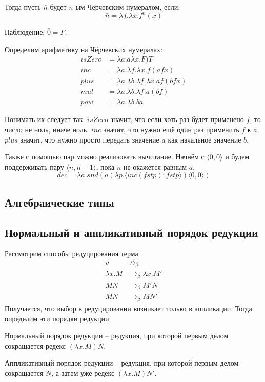 Тогда пусть $\bar{n}$ будет $n$-ым Чёрчевским нумералом, если:
\begin{equation}
\bar{n} = \lambda f . \lambda x . f^n(x)
\end{equation}

Наблюдение: $\bar{0} = F$.

Определим арифметику на Чёрчевских нумералах:
\begin{align*}
isZero &= \lambda a . a \lambda x . F) T \\
inc &= \lambda a . \lambda f . \lambda x . f (a f x) \\
plus &= \lambda a . \lambda  b . \lambda f . \lambda x . a f (b f x) \\
mul &= \lambda a . \lambda b . \lambda f . a (b f) \\
pow &= \lambda a . \lambda b . b a
\end{align*}

Понимать их следует так: $isZero$ значит, что если хоть раз будет применено $f$, 
то число не ноль, иначе ноль. $inc$ значит, что нужно ещё
один раз применить $f$ к $a$. $plus$ значит, что нужно просто передать значение
$a$ как начальное значение $b$.

Также с помощью пар можно реализовать вычитание. Начнём с $\langle 0, 0 \rangle$ и будем
поддерживать пару $\langle n, n - 1 \rangle$, пока $n$ не окажется равным $a$.
\begin{equation}
dec = \lambda a . snd (a (\lambda p . \langle inc (fst p); fst p \rangle ) \langle 0, 0 \rangle )
\end{equation}

\subsection{Алгебраические типы}
\label{sec-3-4}


\subsection{Нормальный и аппликативный порядок редукции}
\label{sec-3-5}
Рассмотрим способы редуцирования терма
\begin{align*}
v &\not\rightarrow_\beta \\
\lambda x . M &\rightarrow_\beta \lambda x . M' \\
M N &\rightarrow_\beta M' N \\
M N &\rightarrow_\beta M N'
\end{align*}
Получается, что выбор в редуцировании возникает только в аппликации. Тогда
определим эти порядки редукции:

Нормальный порядок редукции -- редукция, при которой первым делом сокращается
редекс $(\lambda x . M) N$.

Аппликативный порядок редукции -- редукция, при которой первым делом сокращается
$N$, а затем уже редекс $(\lambda x . M) N'$.
